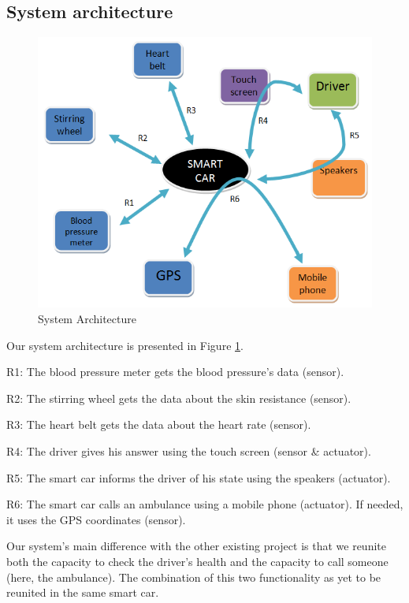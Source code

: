 \documentclass[a4paper]{article}
\begin{document}
\subsection{System architecture}
\begin{figure}
	\centering
	\includegraphics[scale=0.5]{architecture}
	\caption{System Architecture}
	\label{fig:sys}
\end{figure}
Our system architecture is presented in Figure \ref{fig:sys}.
\begin{description}\addtolength{\itemsep}{-0.5\baselineskip}
	\item{R1:} The blood pressure meter gets the blood pressure’s data (sensor).
	\item{R2:} The stirring wheel gets the data about the skin resistance (sensor).
	\item{R3:} The heart belt gets the data about the heart rate (sensor).
	\item{R4:} The driver gives his answer using the touch screen (sensor \& actuator).
	\item{R5:} The smart car informs the driver of his state using the speakers (actuator).
	\item{R6:} The smart car calls an ambulance using a mobile phone (actuator). If needed, it uses the GPS coordinates (sensor).
\end{description}
Our system’s main difference with the other existing project is that we reunite both the capacity to check the driver’s health and the capacity to call someone (here, the ambulance). The combination of this two functionality as yet to be reunited in the same smart car.
\newpage	%
\end{document}
